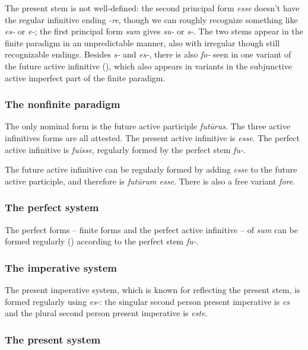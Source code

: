\documentclass[a4paper, oneside]{report}
\newcommand{\form}[1]{\emph{#1}}
\begin{document}
The present stem is not well-defined:
the second principal form \form{esse}
doesn't have the regular infinitive ending \form{-re},
though we can roughly recognize something like \form{es-} or \form{e-};
the first principal form \form{sum} gives \form{su-} or \form{s-}.
The two stems appear in the finite paradigm in an unpredictable manner, 
also with irregular though still recognizable endings.
Besides \form{s-} and \form{es-},
there is also \form{fo-} seen in one variant of the future active infinitive
(),
which also appears in variants in
the subjunctive active imperfect part of the finite paradigm.

\subsubsection{The nonfinite paradigm}\label{sec:verb-inflection.irregular.sum.nonfinite}

The only nominal form is the future active participle \form{futūrus}.
The three active infinitives forms are all attested.
The present active infinitive is \form{esse}.
The perfect active infinitive is \form{fuisse}, 
regularly formed by the perfect stem \form{fu-}.

The future active infinitive can be regularly formed by adding \form{esse} 
to the future active participle,
and therefore is \form{futūrum esse}.
There is also a free variant \form{fore}.

\subsubsection{The perfect system}

The perfect forms -- finite forms and the perfect active infinitive -- 
of \form{sum} can be formed regularly ()
according to the perfect stem \form{fu-}.

\subsubsection{The imperative system}

The present imperative system, 
which is known for reflecting the present stem,
is formed regularly using \form{es-}:
the singular second person present imperative is \form{es}
and the plural second person present imperative is \form{este}.

\subsubsection{The present system}
\end{document}
